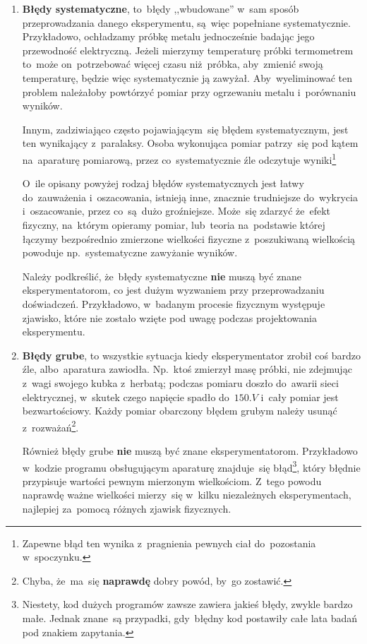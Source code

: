 \documentclass[a4paper,11pt]{article}
\newcommand{\tb}{\textbf}
\begin{document}
\begin{enumerate}
\item \textbf{Błędy systematyczne}, to~błędy ,,wbudowane'' w~sam
  sposób przeprowadzania danego eksperymentu, są~więc popełniane
  systematycznie. Przykładowo, ochładzamy próbkę metalu jednocześnie
  badając jego przewodność elektryczną. Jeżeli mierzymy temperaturę
  próbki termometrem to~może on~potrzebować więcej czasu niż~próbka,
  aby~zmienić swoją temperaturę, będzie więc systematycznie ją
  zawyżał. Aby~wyeliminować ten problem należałoby powtórzyć pomiar
  przy ogrzewaniu metalu i~porównaniu wyników.

  Innym, zadziwiająco często pojawiającym~się błędem systematycznym,
  jest ten wynikający z~paralaksy. Osoba wykonująca pomiar patrzy~się
  pod kątem na~aparaturę pomiarową, przez co~systematycznie źle
  odczytuje wyniki\footnote{Zapewne błąd ten wynika z~pragnienia
    pewnych ciał do~pozostania w~spoczynku.}
  
  O~ile opisany powyżej rodzaj błędów systematycznych jest łatwy
  do~zauważenia i~oszacowania, istnieją inne, znacznie trudniejsze
  do~wykrycia i~oszacowanie, przez co~są~dużo groźniejsze. Może~się
  zdarzyć że~efekt fizyczny, na~którym opieramy pomiar, lub~teoria
  na~podstawie której łączymy bezpośrednio zmierzone wielkości
  fizyczne z~poszukiwaną wielkością powoduje np.~systematyczne
  zawyżanie wyników.

  Należy podkreślić, że~błędy systematyczne \tb{nie} muszą być znane
  eksperymentatorom, co jest dużym wyzwaniem przy przeprowadzaniu
  doświadczeń. Przykładowo, w~badanym procesie fizycznym występuje
  zjawisko, które nie zostało wzięte pod uwagę podczas projektowania
  eksperymentu.

\item \textbf{Błędy grube}, to wszystkie sytuacja kiedy
  eksperymentator zrobił coś bardzo źle, albo~aparatura zawiodła.
  Np.~ktoś zmierzył masę próbki, nie zdejmując z~wagi swojego kubka
  z~herbatą; podczas pomiaru doszło do~awarii sieci elektrycznej,
  w~skutek czego napięcie spadło do~$150 \si{.V}$ i~cały pomiar jest
  bezwartościowy. Każdy pomiar obarczony błędem grubym należy usunąć
  z~rozważań\footnote{Chyba, że~ma~się \tb{naprawdę} dobry powód,
    by~go zostawić.}.

  Również błędy grube \textbf{nie} muszą być znane eksperymentatorom.
  Przykładowo w~kodzie programu obsługującym aparaturę znajduje~się
  błąd\footnote{Niestety, kod dużych programów zawsze zawiera jakieś
    błędy, zwykle bardzo małe. Jednak znane~są przypadki, gdy~błędny
    kod postawiły całe lata badań pod znakiem zapytania.}, który
  błędnie przypisuje wartości pewnym mierzonym wielkościom. Z~tego
  powodu naprawdę ważne wielkości mierzy~się w~kilku niezależnych
  eksperymentach, najlepiej za~pomocą różnych zjawisk fizycznych.


\end{enumerate}
\end{document}

